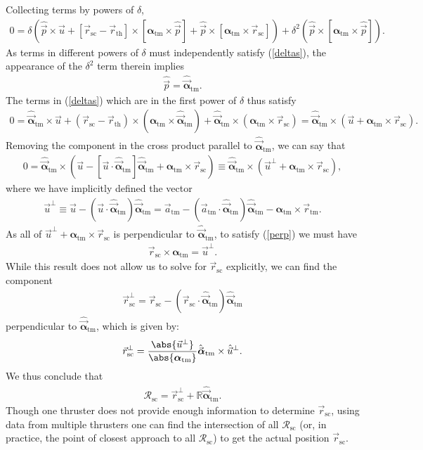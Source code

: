 \documentclass[10pt]{article}
\renewcommand{\t}{\text} %
\renewcommand{\c}{\cdot} %
\newcommand{\f}[2]{\dfrac{#1}{#2}} %
\newcommand{\p}[1]{\left(#1\right)} %
\renewcommand{\sp}[1]{\left[#1\right]} %
\newcommand{\R}{\mathbb{R}} %
\renewcommand{\v}{\vec} %
\newcommand{\uv}[1]{\hat{\vec{#1}}} %
\newcommand{\vv}{\boldsymbol} %
\newcommand{\uvv}[1]{\uv{\vv{#1}}} %
\renewcommand{\sc}{_{\t{sc}}}
\renewcommand{\th}{_{\t{th}}}
\newcommand{\tm}{_{\t{tm}}}
\begin{document}
Collecting terms by powers of $\delta$,
\begin{align}
  0=\delta\p{\uv p\times\v u+\sp{\v r\sc-\v r\th}\times
    \sp{\vv\alpha\tm\times\uv p}+\uv p\times\sp{\vv\alpha\tm\times\v
      r\sc}}+\delta^2\p{\uv p\times\sp{\vv\alpha\tm\times\uv p}}.
  \label{deltas}
\end{align}
As terms in different powers of $\delta$ must independently satisfy
(\ref{deltas}), the appearance of the $\delta^2$ term therein implies
\begin{align}
  \uv p=\uvv\alpha\tm.
\end{align}
The terms in (\ref{deltas}) which are in the first power of $\delta$
thus satisfy
\begin{align}
  0=\uvv\alpha\tm\times\v u+\p{\v r\sc-\v r\th}\times
  \p{\vv\alpha\tm\times\uvv\alpha\tm}
  +\uvv\alpha\tm\times\p{\vv\alpha\tm\times\v
    r\sc}=\uvv\alpha\tm\times\p{\v u+\vv\alpha\tm\times\v r\sc}.
  \label{perp}
\end{align}
Removing the component in the cross product parallel to
$\uvv\alpha\tm$, we can say that
\begin{align}
  0=\uvv\alpha\tm\times\p{\v u-\sp{\v u\c\uvv\alpha\tm}\uvv\alpha\tm
    +\vv\alpha\tm\times\v r\sc}\equiv\uvv\alpha\tm\times\p{\v
    u^\perp+\vv\alpha\tm\times\v r\sc}, \label{perp}
\end{align}
where we have implicitly defined the vector
\begin{align}
  \v u^\perp\equiv\v u-\p{\v u\c\uvv\alpha\tm}\uvv\alpha\tm=\v
  a\tm-\p{\v a\tm\c\uvv\alpha\tm}\uvv\alpha\tm-\vv\alpha\tm\times\v
  r\tm.
\end{align}
As all of $\v u^\perp+\vv\alpha\tm\times\v r\sc$ is perpendicular to
$\uvv\alpha\tm$, to satisfy (\ref{perp}) we must have
\begin{align}
  \v r\sc\times\vv\alpha\tm=\v u^\perp. \label{result}
\end{align}
While this result does not allow us to solve for $\v r\sc$ explicitly,
we can find the component
\begin{align}
  \v r\sc^\perp=\v r\sc-\p{\v r\sc\c\uvv\alpha\tm}\uvv\alpha\tm
\end{align}
perpendicular to $\uvv\alpha\tm$, which is given by:
\begin{align}
  \v r\sc^\perp=\f{\abs{\v u^\perp}}{\abs{\vv\alpha\tm}}
  \uvv\alpha\tm\times\uv u^\perp.
\end{align}
We thus conclude that
\begin{align}
  \mathcal R\sc=\v r\sc^\perp+\R\uvv\alpha\tm.
\end{align}
Though one thruster does not provide enough information to determine
$\v r\sc$, using data from multiple thrusters one can find the
intersection of all $\mathcal R\sc$ (or, in practice, the point of
closest approach to all $\mathcal R\sc$) to get the actual position
$\v r\sc$.
\end{document}
